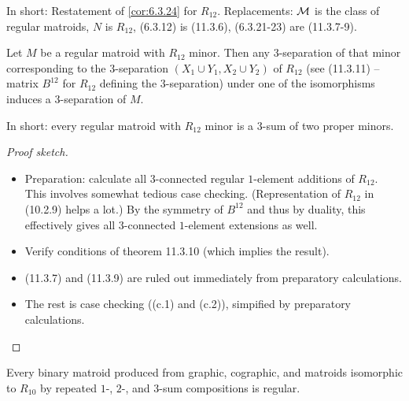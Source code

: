 \begin{theorem}[11.3.10]
  \label{thm:11.3.10}
  In short: Restatement of \ref{cor:6.3.24} for $R_{12}$.
  Replacements: $\mathcal{M}$ is the class of regular matroids, $N$ is $R_{12}$, (6.3.12) is (11.3.6), (6.3.21-23) are (11.3.7-9).
\end{theorem}

\begin{theorem}[11.3.12]
  \label{thm:11.3.12}
  Let $M$ be a regular matroid with $R_{12}$ minor. Then any $3$-separation of that minor corresponding to the $3$-separation $(X_{1} \cup Y_{1}, X_{2} \cup Y_{2})$ of $R_{12}$ (see (11.3.11) -- matrix $B^{12}$ for $R_{12}$ defining the $3$-separation) under one of the isomorphisms induces a $3$-separation of $M$.

  In short: every regular matroid with $R_{12}$ minor is a $3$-sum of two proper minors.
\end{theorem}

\begin{proof}[Proof sketch]
  \begin{itemize}
    \item Preparation: calculate all $3$-connected regular $1$-element additions of $R_{12}$. This involves somewhat tedious case checking. (Representation of $R_{12}$ in (10.2.9) helps a lot.) By the symmetry of $B^{12}$ and thus by duality, this effectively gives all $3$-connected $1$-element extensions as well.
    \item Verify conditions of theorem 11.3.10 (which implies the result).
    \item (11.3.7) and (11.3.9) are ruled out immediately from preparatory calculations.
    \item The rest is case checking ((c.1) and (c.2)), simpified by preparatory calculations.
  \end{itemize}
\end{proof}

\begin{theorem}
  \label{thm:11.3.14.seymour_easy}
  Every binary matroid produced from graphic, cographic, and matroids isomorphic to $R_{10}$ by repeated $1$-, $2$-, and $3$-sum compositions is regular.
\end{theorem}

